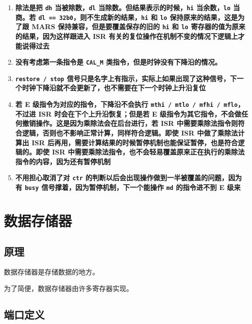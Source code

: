 \documentclass[12pt,AutoFakeBold,AutoFakeSlant]{article}
\providecommand{\tightlist}{%
  \setlength{\itemsep}{0pt}\setlength{\parskip}{0pt}}
\begin{document}
\begin{enumerate}
\def\labelenumi{\arabic{enumi}.}
\tightlist
\item
  \textbf{除法是把 \texttt{dh} 当被除数，\texttt{dl}
  当除数。但结果表示的时候，\texttt{hi} 当余数，\texttt{lo} 当商。若
  \texttt{dl\ ==\ 32\textquotesingle{}b0}，则不生成新的结果，\texttt{hi}
  和 \texttt{lo} 保持原来的结果，这是为了跟 MARS
  保持兼容，但是要覆盖保存的旧的 \texttt{hi} 和 \texttt{lo}
  寄存器的值为原来的结果，因为这样跟进入 ISR
  有关的复位操作在机制不变的情况下逻辑上才能说得过去}
\item
  \textbf{没有考虑第一条指令是 \texttt{CAL\_M}
  类指令，但是时钟没有下降沿的情况。}
\item
  \textbf{\texttt{restore\ /\ stop}
  信号只是名字上有指示，实际上如果出现了这种信号，下一个时钟下降沿就不会更新了，也不需要在下一个时钟上升沿复位}
\item
  \textbf{若 E 级指令为对应的指令，下降沿不会执行
  \texttt{mthi\ /\ mtlo\ /\ mfhi\ /\ mflo}，不过进 ISR
  时会在下个上升沿恢复；但是若 E
  级指令为其它指令，不会做任何撤销操作。这是因为乘除法会在后台进行，若
  ISR
  中需要乘除法指令则符合逻辑，否则也不影响正常计算，同样符合逻辑。即使
  ISR 中做了乘除法计算出 ISR
  后再用，需要计算结果的时候暂停机制也能保证暂停，也是符合逻辑的。即使
  ISR
  中需要乘除法指令，也不会轻易覆盖原来正在执行的乘除法指令的内容，因为还有暂停机制}
\item
  \textbf{不用担心取消了对 \texttt{ctr}
  的判断以后会出现操作做到一半被覆盖的问题，因为有 \texttt{busy}
  信号撑着，因为暂停机制，下一个能操作 \texttt{md} 的指令进不到 E 级来}
\end{enumerate}

\hypertarget{ux6570ux636eux5b58ux50a8ux5668}{%
\section{数据存储器}\label{ux6570ux636eux5b58ux50a8ux5668}}

\hypertarget{ux539fux7406-7}{%
\subsection{原理}\label{ux539fux7406-7}}

数据存储器是存储数据的地方。

为了简便，数据存储器由许多寄存器实现。

\hypertarget{ux7aefux53e3ux5b9aux4e49-5}{%
\subsection{端口定义}\label{ux7aefux53e3ux5b9aux4e49-5}}
\end{document}
